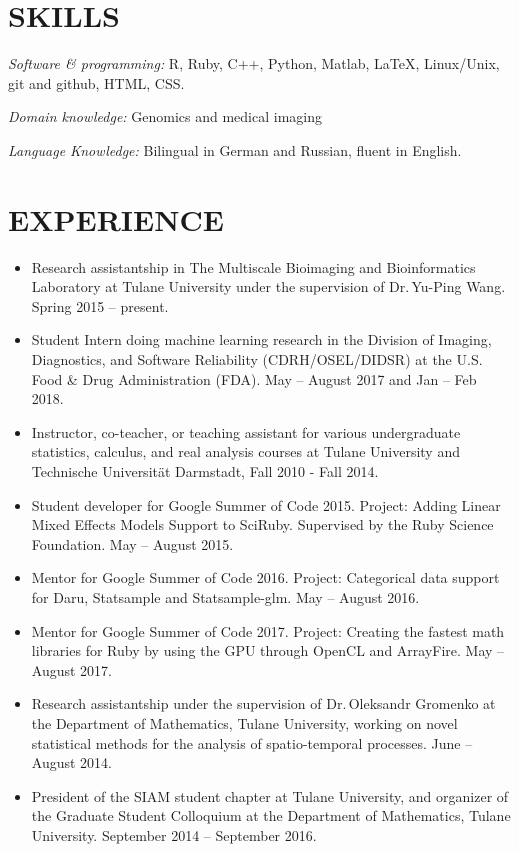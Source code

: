 \documentclass[margin]{res} %
\begin{document}
\begin{resume}

\section{SKILLS}

{\sl Software \& programming:}
R, Ruby, C++, Python, Matlab, \LaTeX, Linux/Unix, git and github, HTML, CSS.

{\sl Domain knowledge:}
Genomics and medical imaging

{\sl Language Knowledge:}
Bilingual in German and Russian, fluent in English.


\section{EXPERIENCE}

\begin{itemize}
  \item Research assistantship in The Multiscale Bioimaging and Bioinformatics Laboratory at Tulane University under the supervision of {Dr.\,Yu-Ping Wang}. Spring 2015 -- present.
  \item Student Intern doing machine learning research in the Division of Imaging, Diagnostics, and Software Reliability (CDRH/OSEL/DIDSR) at the U.S. Food \& Drug Administration (FDA). May -- August 2017 and Jan -- Feb 2018.
    \item Instructor, co-teacher, or teaching assistant for various undergraduate statistics, calculus, and real analysis courses at Tulane University and Technische Universit\"{a}t Darmstadt, Fall 2010 - Fall 2014.
    \item Student developer for Google Summer of Code 2015. Project: Adding Linear Mixed Effects Models Support to SciRuby. Supervised by the Ruby Science Foundation. May -- August 2015.
    \item Mentor for Google Summer of Code 2016. Project: Categorical data support for Daru, Statsample and Statsample-glm. May -- August 2016.
    \item Mentor for Google Summer of Code 2017. Project: Creating the fastest math libraries for Ruby by using the GPU through OpenCL and ArrayFire. May -- August 2017.
    \item Research assistantship under the supervision of {Dr.\,Oleksandr Gromenko} at the Department of Mathematics, Tulane University, working on novel statistical methods for the analysis of spatio-temporal processes. June -- August 2014.
    \item President of the SIAM student chapter at Tulane University, and organizer of the Graduate Student Colloquium at the Department of Mathematics, Tulane University. September 2014 -- September 2016.
\end{itemize}


\end{resume}
\end{document}
